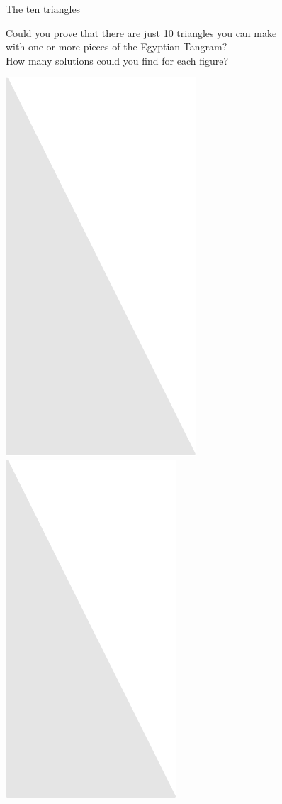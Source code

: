 \documentclass[14pt]{beamer}
\begin{document}
    \begin{frame}{The ten triangles}

        \vspace{-0.5em}
        \begin{center}
            {\small Could you prove that there are just 10 triangles you can make\\with one or more pieces of the Egyptian Tangram?\\How many solutions could you find for each figure?}

            \bigskip\bigskip

            \includegraphics[scale=0.3]{figures/figure024f.pdf}\quad
            \includegraphics[scale=0.3]{figures/figure024e.pdf}\quad

\end{center}
\end{frame}
\end{document}
